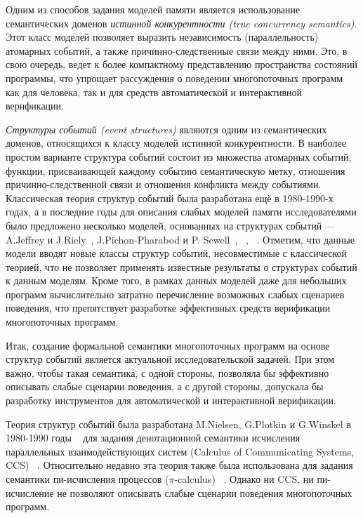 Одним из способов задания моделей памяти
является использование семантических доменов
\emph{истинной конкурентности (true concurrency semantics)}.
Этот класс моделей позволяет выразить независимость (параллельность) атомарных событий, а также 
причинно-следственные связи между ними. Это, в свою очередь,
 ведет к более компактному представлению пространства состояний программы,
что упрощает рассуждения 
о поведении многопоточных программ как для человека, 
так и для  средств  автоматической и интерактивной верификации. 

\emph{Структуры событий (event structures)} являются одним из семантических доменов, 
относящихся к классу моделей истинной конкурентности.
В наиболее простом варианте структура событий состоит из множества атомарных событий,
функции, присваивающей каждому событию семантическую метку,
отношения причинно-следственной связи и отношения конфликта между событиями.
Классическая теория структур событий была разработана ещё в 1980-1990-х годах, а в последние годы для описания слабых моделей памяти исследователями было предложено несколько моделей,
основанных на структурах событий ---
A.Jeffrey и J.Riely~\autocite{Jeffrey-Riely:LICS16},
J.Pichon-Pharabod и P. Sewell~\autocite{PichonPharabod-Sewell:POPL16},
\Wkm~\autocite{Chakraborty-Vafeiadis:POPL19},
\MRD~\autocite{Paviotti-al:ESOP20}.
Отметим, что данные модели вводят новые классы
структур событий, несовместимые с классической теорией,
что не позволяет применять известные результаты
о структурах событий к данным моделям.
Кроме того, в рамках данных моделей даже для небольших программ
вычислительно затратно перечисление возможных слабых сценариев поведения,
что препятствует разработке эффективных средств верификации многопоточных программ.

Итак, создание формальной семантики 
многопоточных программ на основе структур событий является актуальной исследовательской задачей. При этом важно, чтобы такая семантика, с одной стороны, позволяла бы эффективно описывать слабые сценарии поведения, 
а с другой стороны, допускала бы разработку  
инструментов для автоматической и интерактивной верификации. 

{\progress}
Теория структур событий была разработана M.Nielsen, G.Plotkin и G.Winskel в 1980-1990 годы%
~\autocite{Nielsen:REX93,Sassone:MFCS1993,Vaandrager:TCS1991,Winskel-TCS:09} 
для задания денотационной семантики 
исчисления параллельных взаимодействующих систем (Calculus of Communicating Systems, CCS)%
~\autocite{Winskel:ICALP1982}.
Относительно недавно эта теория также была использована 
для задания семантики пи-исчисления процессов ($\pi$-calculus)%
~\autocite{Varacca-Nobuko:TCS10,Crafa-al:FSCCS12,Hildebrandt-al:LATA2017}.
Однако ни CCS, ни пи-исчисление не позволяют описывать 
слабые сценарии поведения многопоточных программ.

